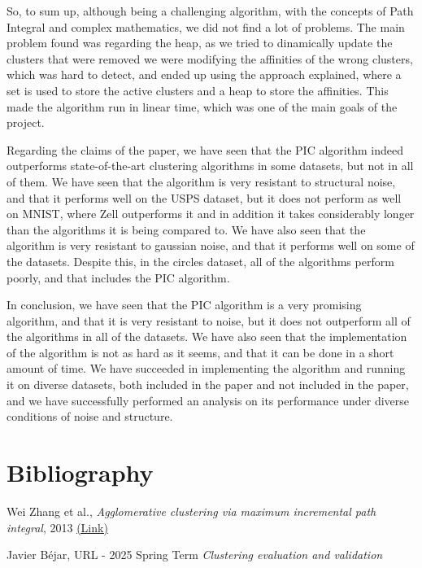 \documentclass[
	10pt,
	parskip=half-,	
	paper=a4,
	english
	]{scrartcl}
\begin{document}
So, to sum up, although being a challenging algorithm, with the concepts of Path Integral and complex mathematics, we did not find a lot of problems. The main problem  found was regarding the heap, as we tried to dinamically update the clusters that were removed we were modifying the affinities of the wrong clusters, which was hard to detect, and ended up using the approach explained, where a set is used to store the active clusters and a heap to store the affinities. This made the algorithm run in linear time, which was one of the main goals of the project.

Regarding the claims of the paper, we have seen that the PIC algorithm indeed outperforms state-of-the-art clustering algorithms in some datasets, but not in all of them. We have seen that the algorithm is very resistant to structural noise, and that it performs well on the USPS dataset, but it does not perform as well on MNIST, where Zell outperforms it and in addition it takes considerably longer than the algorithms it is being compared to. We have also seen that the algorithm is very resistant to gaussian noise, and that it performs well on some of the datasets. Despite this, in the circles dataset, all of the algorithms perform poorly, and that includes the PIC algorithm.

In conclusion, we have seen that the PIC algorithm is a very promising algorithm, and that it is very resistant to noise, but it does not outperform all of the algorithms in all of the datasets. We have also seen that the implementation of the algorithm is not as hard as it seems, and that it can be done in a short amount of time. We have succeeded in implementing the algorithm and running it on diverse datasets, both included in the paper and not included in the paper, and we have successfully performed an analysis on its performance under diverse conditions of noise and structure.


\newpage
\section{Bibliography}

\renewcommand{\section}[2]{}%
\begin{thebibliography}{9}

Wei Zhang et al.,
\textit{Agglomerative clustering via maximum incremental path integral}, 2013
\href{https://www.sciencedirect.com/science/article/pii/S0031320313001830}{(Link)}

Javier Béjar,
URL - 2025 Spring Term
\textit{Clustering evaluation and validation}

\end{thebibliography}
\end{document}
